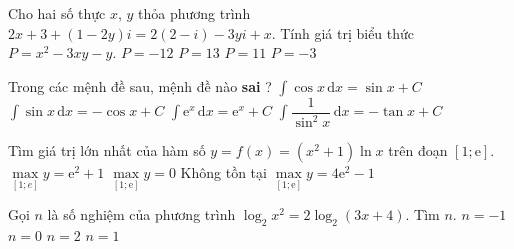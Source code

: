 \begin{ex}%
	Cho hai số thực $x$, $y$ thỏa phương trình $2x+3+(1-2y)i=2(2-i)-3yi+x$. Tính giá trị biểu thức $P=x^2-3xy-y$.
	\choice
	{$P=-12$}
	{\True $P=13$}
	{$P=11$}
	{$P=-3$}
\end{ex}
\begin{ex}%
	Trong các mệnh đề sau, mệnh đề nào \textbf{sai} ?
	\choice
	{$\displaystyle\int \cos x\mathrm{\,d}x=\sin x+C$}
	{$\displaystyle\int \sin x\mathrm{\,d}x=-\cos x+C$}
	{$\displaystyle\int \mathrm{e}^x\mathrm{\,d}x=\mathrm{e}^x+C$}
	{\True $\displaystyle\int \dfrac{1}{\sin^2x}\mathrm{\,d}x=-\tan x+C$}
\end{ex}
\begin{ex}%
	Tìm giá trị lớn nhất của hàm số $y=f(x)=(x^2+1)\ln x$ trên đoạn $[1;\mathrm{e}]$.
	\choice
	{\True $ \max\limits_{[1;e]} y=\mathrm{e}^2+1$}
	{$ \max\limits_{[1;\mathrm{e}]} y=0$}
	{Không tồn tại}
	{$ \max\limits_{[1;\mathrm{e}]} y=4\mathrm{e}^2-1$}
\end{ex}
\begin{ex}%
	Gọi $n$ là số nghiệm của phương trình $\log _2x^2=2\log _2(3x+4)$. Tìm $n$.
	\choice
	{$n=-1$}
	{$n=0$}
	{$n=2$}
	{\True $n=1$}
\end{ex}
